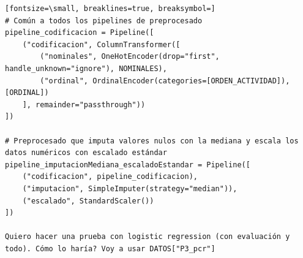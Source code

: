 \documentclass[12pt,a4paper,oneside]{book}
\begin{document}
\begin{iaprompt}
\begin{Verbatim}[fontsize=\small, breaklines=true, breaksymbol=]
# Común a todos los pipelines de preprocesado
pipeline_codificacion = Pipeline([
    ("codificacion", ColumnTransformer([
        ("nominales", OneHotEncoder(drop="first", handle_unknown="ignore"), NOMINALES),
        ("ordinal", OrdinalEncoder(categories=[ORDEN_ACTIVIDAD]), [ORDINAL])
    ], remainder="passthrough"))
])

# Preprocesado que imputa valores nulos con la mediana y escala los datos numéricos con escalado estándar
pipeline_imputacionMediana_escaladoEstandar = Pipeline([
    ("codificacion", pipeline_codificacion),
    ("imputacion", SimpleImputer(strategy="median")),
    ("escalado", StandardScaler())
])

Quiero hacer una prueba con logistic regression (con evaluación y todo). Cómo lo haría? Voy a usar DATOS["P3_pcr"]
\end{Verbatim}
\end{iaprompt}
\end{document}
